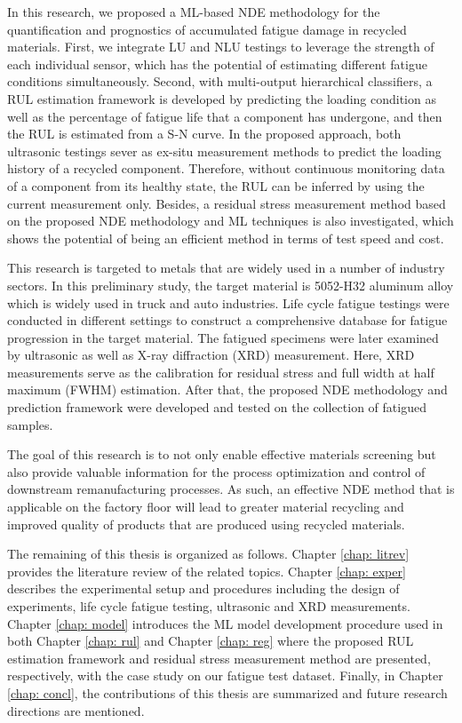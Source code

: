In this research, we proposed a ML-based NDE methodology for the quantification and prognostics of accumulated fatigue damage in recycled materials. First, we integrate LU and NLU testings to leverage the strength of each individual sensor, which has the potential of estimating different fatigue conditions simultaneously. Second, with multi-output hierarchical classifiers, a RUL estimation framework is developed by predicting the loading condition as well as the percentage of fatigue life that a component has undergone, and then the RUL is estimated from a S-N curve. In the proposed approach, both ultrasonic testings sever as ex-situ measurement methods to predict the loading history of a recycled component. Therefore, without continuous monitoring data of a component from its healthy state, the RUL can be inferred by using the current measurement only. Besides, a residual stress measurement method based on the proposed NDE methodology and ML techniques is also investigated, which shows the potential of being an efficient method in terms of test speed and cost.

This research is targeted to metals that are widely used in a number of industry sectors. In this preliminary study, the target material is 5052-H32 aluminum alloy which is widely used in truck and auto industries. Life cycle fatigue testings were conducted in different settings to construct a comprehensive database for fatigue progression in the target material. The fatigued specimens were later examined by ultrasonic as well as X-ray diffraction (XRD) measurement. Here, XRD measurements serve as the calibration for residual stress and full width at half maximum (FWHM) estimation. After that, the proposed NDE methodology and prediction framework were developed and tested on the collection of fatigued samples.

The goal of this research is to not only enable effective materials screening but also provide valuable information for the process optimization and control of downstream remanufacturing processes. As such, an effective NDE method that is applicable on the factory floor will lead to greater material recycling and improved quality of products that are produced using recycled materials.

The remaining of this thesis is organized as follows. Chapter \ref{chap: litrev} provides the literature review of the related topics. Chapter \ref{chap: exper} describes the experimental setup and procedures including the design of experiments, life cycle fatigue testing, ultrasonic and XRD measurements. Chapter \ref{chap: model} introduces the ML model development procedure used in both Chapter \ref{chap: rul} and Chapter \ref{chap: reg} where the proposed RUL estimation framework and residual stress measurement method are presented, respectively, with the case study on our fatigue test dataset. Finally, in Chapter \ref{chap: concl}, the contributions of this thesis are summarized and future research directions are mentioned.


